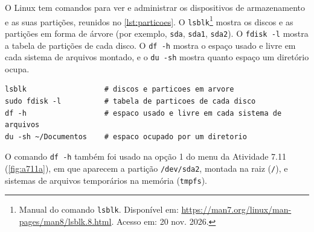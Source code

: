 O Linux tem comandos para ver e administrar os dispositivos de armazenamento e as suas
partições, reunidos no \autoref{lst:particoes}. O \texttt{lsblk}\footnote{Manual do comando
\texttt{lsblk}. Disponível em: \url{https://man7.org/linux/man-pages/man8/lsblk.8.html}.
Acesso em: 20 nov. 2026.} mostra os discos e as partições em forma de árvore (por exemplo,
\texttt{sda}, \texttt{sda1}, \texttt{sda2}). O \texttt{fdisk -l} mostra a tabela de partições
de cada disco. O \texttt{df -h} mostra o espaço usado e livre em cada sistema de arquivos
montado, e o \texttt{du -sh} mostra quanto espaço um diretório ocupa.

\begin{lstlisting}[caption={Comandos para consultar discos e partições no Linux},label={lst:particoes}]
lsblk                  # discos e particoes em arvore
sudo fdisk -l          # tabela de particoes de cada disco
df -h                  # espaco usado e livre em cada sistema de arquivos
du -sh ~/Documentos    # espaco ocupado por um diretorio
\end{lstlisting}

O comando \texttt{df -h} também foi usado na opção 1 do menu da Atividade 7.11
(\autoref{fig:a711a}), em que aparecem a partição \texttt{/dev/sda2}, montada na raiz
(\texttt{/}), e sistemas de arquivos temporários na memória (\texttt{tmpfs}).
